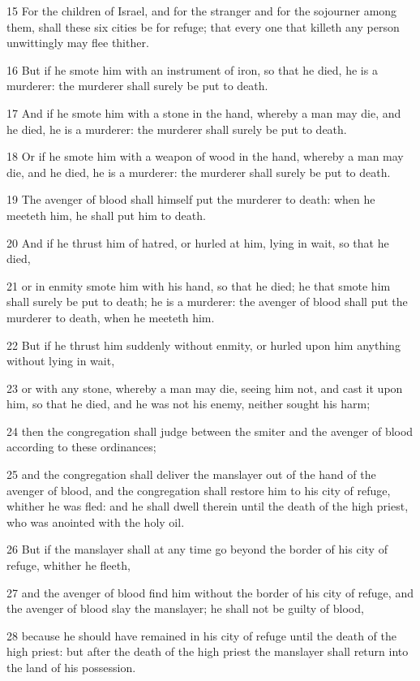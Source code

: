 \par 15 For the children of Israel, and for the stranger and for the sojourner among them, shall these six cities be for refuge; that every one that killeth any person unwittingly may flee thither.
\par 16 But if he smote him with an instrument of iron, so that he died, he is a murderer: the murderer shall surely be put to death.
\par 17 And if he smote him with a stone in the hand, whereby a man may die, and he died, he is a murderer: the murderer shall surely be put to death.
\par 18 Or if he smote him with a weapon of wood in the hand, whereby a man may die, and he died, he is a murderer: the murderer shall surely be put to death.
\par 19 The avenger of blood shall himself put the murderer to death: when he meeteth him, he shall put him to death.
\par 20 And if he thrust him of hatred, or hurled at him, lying in wait, so that he died,
\par 21 or in enmity smote him with his hand, so that he died; he that smote him shall surely be put to death; he is a murderer: the avenger of blood shall put the murderer to death, when he meeteth him.
\par 22 But if he thrust him suddenly without enmity, or hurled upon him anything without lying in wait,
\par 23 or with any stone, whereby a man may die, seeing him not, and cast it upon him, so that he died, and he was not his enemy, neither sought his harm;
\par 24 then the congregation shall judge between the smiter and the avenger of blood according to these ordinances;
\par 25 and the congregation shall deliver the manslayer out of the hand of the avenger of blood, and the congregation shall restore him to his city of refuge, whither he was fled: and he shall dwell therein until the death of the high priest, who was anointed with the holy oil.
\par 26 But if the manslayer shall at any time go beyond the border of his city of refuge, whither he fleeth,
\par 27 and the avenger of blood find him without the border of his city of refuge, and the avenger of blood slay the manslayer; he shall not be guilty of blood,
\par 28 because he should have remained in his city of refuge until the death of the high priest: but after the death of the high priest the manslayer shall return into the land of his possession.
